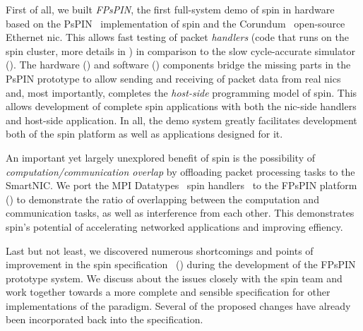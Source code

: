 First of all, we built \emph{FPsPIN}, the first full-system demo of \ac{spin} in hardware based on the PsPIN~\cite{di_girolamo_pspin_2021} implementation of \ac{spin} and the Corundum~\cite{forencich_corundum_2020} open-source Ethernet \ac{nic}.  This allows fast testing of packet \emph{handlers} (code that runs on the \ac{spin} cluster, more details in ) in comparison to the slow cycle-accurate simulator ().  The hardware () and software () components bridge the missing parts in the PsPIN prototype to allow sending and receiving of packet data from real \ac{nic}s and, most importantly, completes the \emph{host-side} programming model of \ac{spin}.  This allows development of complete \ac{spin} applications with both the \ac{nic}-side handlers and host-side application.  In all, the demo system greatly facilitates development both of the \ac{spin} platform as well as applications designed for it.

An important yet largely unexplored benefit of \ac{spin} is the possibility of \emph{computation/communication overlap} by offloading packet processing tasks to the SmartNIC.  We port the MPI Datatypes~\cite{ropo_processing_2009} \ac{spin} handlers~\cite{di_girolamo_network-accelerated_2019} to the FPsPIN platform () to demonstrate the ratio of overlapping between the computation and communication tasks, as well as interference from each other.  This demonstrates \ac{spin}'s potential of accelerating networked applications and improving effiency.

Last but not least, we discovered numerous shortcomings and points of improvement in the \ac{spin} specification~\cite{hoefler_spin_2017} () during the development of the FPsPIN prototype system.  We discuss about the issues closely with the \ac{spin} team and work together towards a more complete and sensible specification for other implementations of the paradigm.  Several of the proposed changes have already been incorporated back into the specification.